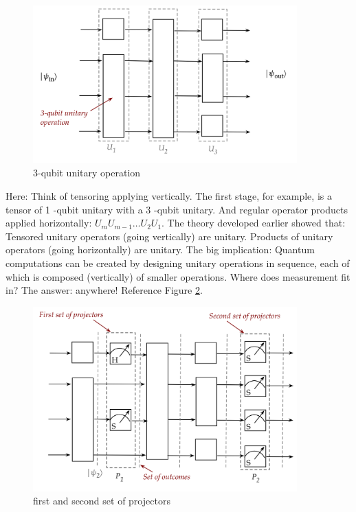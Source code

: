 \documentclass[main.tex]{subfiles}
\begin{document}
    \begin{figure}
        \centering
        \includegraphics[width=4in]{notes/figs/n07/14unitary5.png}
        \caption{3-qubit unitary operation}
        \label{fig:14unitary5}
    \end{figure}
    
    Here: Think of tensoring applying vertically. The first stage, for example, is a tensor of 1 -qubit unitary with a 3 -qubit unitary. And regular operator products applied horizontally: $U_{m} U_{m-1} \ldots U_{2} U_{1}$. The theory developed earlier showed that: Tensored unitary operators (going vertically) are unitary. Products of unitary operators (going horizontally) are unitary. The big implication: Quantum computations can be created by designing unitary operations in sequence, each of which is composed (vertically) of smaller operations. Where does measurement fit in? The answer: anywhere! Reference Figure \ref{fig:15unitary6}.
    
    \begin{figure}
        \centering
        \includegraphics[width=4in]{notes/figs/n07/15unitary6.png}
        \caption{first and second set of projectors}
        \label{fig:15unitary6}
    \end{figure}
    
\end{document}
